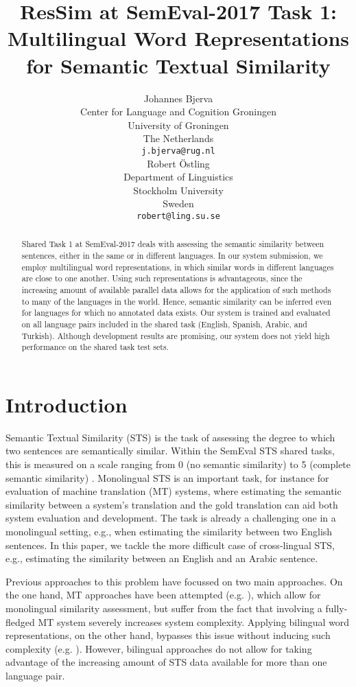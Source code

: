 \documentclass[11pt,a4paper]{article}
\title{ResSim at SemEval-2017 Task 1:\\Multilingual Word Representations for Semantic Textual Similarity}
\author{Johannes Bjerva \\
Center for Language and Cognition Groningen \\
University of Groningen \\
The Netherlands \\
{\tt j.bjerva@rug.nl} \\\And
Robert {\"O}stling \\
Department of Linguistics \\
Stockholm University \\
Sweden \\
{\tt robert@ling.su.se} \\}
\date{}
\begin{document}
\maketitle
\begin{abstract}
Shared Task 1 at SemEval-2017 deals with assessing the semantic similarity between sentences, either in the same or in different languages.
In our system submission, we employ multilingual word representations, in which similar words in different languages are close to one another.
Using such representations is advantageous, since the increasing amount of available parallel data allows for the application of such methods to many of the languages in the world.
Hence, semantic similarity can be inferred even for languages for which no annotated data exists.
Our system is trained and evaluated on all language pairs included in the shared task (English, Spanish, Arabic, and Turkish).
Although development results are promising, our system does not yield high performance on the shared task test sets.
\end{abstract}

\section{Introduction}

Semantic Textual Similarity (STS) is the task of assessing the degree to which two sentences are semantically similar.
Within the SemEval STS shared tasks, this is measured on a scale ranging from 0 (no semantic similarity) to 5 (complete semantic similarity) \cite{semeval17}.
Monolingual STS is an important task, for instance for evaluation of machine translation (MT) systems, where estimating the semantic similarity between a system's translation and the gold translation can aid both system evaluation and development.
The task is already a challenging one in a monolingual setting, e.g., when estimating the similarity between two English sentences.
In this paper, we tackle the more difficult case of cross-lingual STS, e.g., estimating the similarity between an English and an Arabic sentence.

Previous approaches to this problem have focussed on two main approaches.
On the one hand, MT approaches have been attempted (e.g. ), which allow for monolingual similarity assessment, but suffer from the fact that involving a fully-fledged MT system severely increases system complexity.
Applying bilingual word representations, on the other hand, bypasses this issue without inducing such complexity (e.g. ).
However, bilingual approaches do not allow for taking advantage of the increasing amount of STS data available for more than one language pair.
\end{document}
